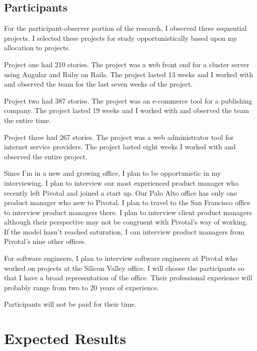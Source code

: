 \documentclass[preprint,12pt,3p]{elsarticle}
\begin{document}
\subsection{Participants}
For the participant-observer portion of the research, I %
observed three sequential projects.  I selected these projects for study opportunistically based upon my allocation to projects.

Project one had 210 stories. The project was a web front end for a cluster server using Angular and Ruby on Rails. The project lasted 13 weeks and I worked with and observed the team for the last seven weeks of the project. 

Project two had 387 stories. The project was an e-commerce tool for a publishing company. The project lasted 19 weeks and I worked with and observed the team the entire time.

Project three had 267 stories. The project was a web administrator tool for internet service providers. The project lasted eight weeks I worked with and observed the entire project.

Since I'm in a new and growing office, I plan to be opportunistic in my interviewing. I plan to interview our most experienced product manager who recently left Pivotal and joined a start up. Our Palo Alto office has only one product manager who new to Pivotal. I plan to travel to the San Francisco office to interview product managers there. I plan to interview client product managers although their perspective may not be congruent with Pivotal's way of working. If the model hasn't reached saturation, I can interview product managers from Pivotal's nine other offices.

For software engineers, I plan to interview software engineers at Pivotal who worked on projects at the Silicon Valley office. I will choose the participants so that I have a broad representation of the office. Their professional experience will probably range from two to 20 years of experience. 

Participants will not be paid for their time. 

\section{Expected Results}
\label{ExpectedResults}
\end{document}
